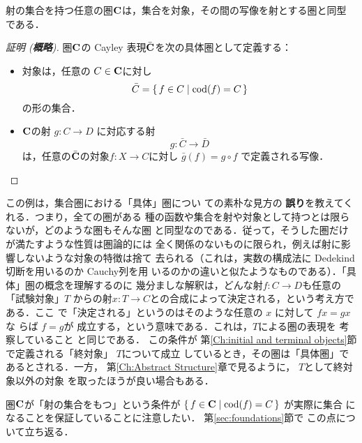 \begin{theorem}
 射の集合を持つ任意の圏${\bf C}$は，集合を対象，その間の写像を射とする圏と同型
 である．
\end{theorem}
\begin{proof}[証明 \textup({\bfseries 概略}\textup)]
 圏${\bf C}$の Cayley 表現$\bar{\bf C}$を次の具体圏として定義する：
 \begin{itemize}
  \item 対象は，任意の $C \in {\bf C}$に対し
	\[
	 \bar C = \set{ f \in C | \mathrm{cod}(f) = C}
	\]
	の形の集合．
  \item ${\bf C}$の射 $g: C \to D$ に対応する射
	\[
	 g: \bar C \to \bar D
	\]
	は，任意の$\bar{\bf C}$の対象$f: X \to C$に対し $\bar g(f) = g
	\circ f$ で定義される写像．
	\begin{center}
	 \end{center}
 \end{itemize}
\end{proof}
\begin{remark}
 この例は，集合圏における「具体」圏につい
 ての素朴な見方の {\bfseries 誤り}を教えてくれる．つまり，全ての圏がある
 種の函数や集合を射や対象として持つとは限らないが，どのような圏もそんな圏
 と同型なのである．従って，そうした圏だけが満たすような性質は圏論的には
 全く関係のないものに限られ，例えば射に影響しないような対象の特徴は捨て
 去られる（これは，実数の構成法に Dedekind 切断を用いるのか Cauchy列を用
 いるのかの違いと似たようなものである）．「具体」圏の概念を理解するのに
 幾分ましな解釈は，どんな射$f:C\to D$も任意の「試験対象」$T$
 からの射$x: T\to C$との合成によって決定される，という考え方である．ここ
 で「決定される」というのはそのような任意の $x$ に対して $fx = gx$ な
 らば $f = g$が 成立する，という意味である．これは，$T$による圏の表現を
 考察していること と同じである． この条件が
 第\ref{Ch:initial and terminal objects}節で定義される「終対象」
 $T$について成立 しているとき，その圏は「具体圏」であるとされる．一方，
 第\ref{Ch:Abstract Structure}章で見るように， $T$として終対象以外の対象
 を取ったほうが良い場合もある．

 圏${\bf C}$が「射の集合をもつ」という条件が
 $\set{f \in {\bf C} | \mathrm{cod}(f) = C}$ が実際に集合
 になることを保証していることに注意したい． 第\ref{sec:foundations}節で
 この点について立ち返る．
\end{remark}

